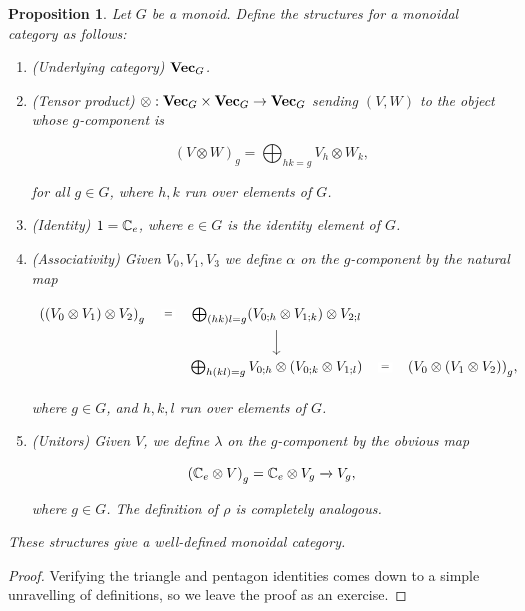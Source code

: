 \documentclass{article}
\newtheorem{proposition}{Proposition}[section]
\theoremstyle{definition}
\numberwithin{figure}{section}
\begin{document}
\begin{proposition} Let $G$ be a monoid. Define the structures for a monoidal category as follows:

\begin{enumerate}
\item (Underlying category) $\bold{Vec}_G$.

\item (Tensor product) $\otimes: \bold{Vec}_G\times \bold{Vec}_G \to \bold{Vec}_G$ sending $(V,W)$ to the object whose $g$-component is

$$\left(V\otimes W\right)_g=\bigoplus_{hk=g}V_h\otimes W_k,$$

for all $g\in G$, where $h,k$ run over elements of $G$.

\item (Identity) $1=\mathbb{C}_e$, where $e\in G$ is the identity element of $G$.

\item (Associativity) Given $V_0,V_1,V_3$ we define $\alpha$ on the $g$-component by the natural map

\[\begin{tikzcd}
	{\left(\left(V_0\otimes V_1\right)\otimes V_2\right)_g} & {\bigoplus_{(hk)l=g} (V_{0;h}\otimes V_{1;k})\otimes V_{2;l}} \\
	& {\bigoplus_{h(kl)=g}V_{0;h}\otimes\left(V_{0;k}\otimes V_{1;l}\right)} & {\left(V_{0}\otimes \left(V_{1}\otimes V_{2}\right)\right)_g},
	\arrow["{=}"{description}, draw=none, from=1-1, to=1-2]
	\arrow["", from=1-2, to=2-2]
	\arrow["{=}"{description}, draw=none, from=2-2, to=2-3]
\end{tikzcd}\]

where $g\in G$, and $h,k,l$ run over elements of $G$. 
\item (Unitors) Given $V$, we define $\lambda$ on the $g$-component by the obvious map

$$\left(\mathbb{C}_e\otimes V\right)_g = \mathbb{C}_e\otimes V_g \xrightarrow{} V_g,$$

where $g\in G$. The definition of $\rho$ is completely analogous.
\end{enumerate}

These structures give a well-defined monoidal category.
\end{proposition}
\begin{proof} Verifying the triangle and pentagon identities comes down to a simple unravelling of definitions, so we leave the proof as an exercise.
\end{proof}
\end{document}
